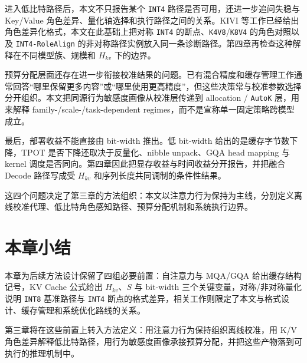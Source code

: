 进入低比特路径后，本文不只报告某个 \texttt{INT4} 路径是否可用，还进一步追问失稳与 Key/Value 角色差异、量化轴选择和执行路径之间的关系。KIVI 等工作已经给出角色差异化格式，本文在此基础上把对称 \texttt{INT4} 的断点、\texttt{K4V8}/\texttt{K8V4} 的角色对照以及 \texttt{INT4-RoleAlign} 的非对称路径实例放入同一条诊断路径。第四章再检查这种解释在不同模型族、规模和 $H_{kv}$ 下的边界。

预算分配层面还存在进一步衔接校准结果的问题。已有混合精度和缓存管理工作通常回答“哪里保留更多内容”或“哪里使用更高精度”，但这些决策常与校准参数选择分开组织。本文把同源行为敏感度画像从校准层传递到 allocation / \texttt{AutoK} 层，用来解释 family-/scale-/task-dependent regimes，而不是宣称单一固定策略跨模型成立。

最后，部署收益不能直接由 bit-width 推出。低 bit-width 给出的是缓存字节数下降，TPOT 是否下降还取决于反量化、nibble unpack、GQA head mapping 与 kernel 调度是否同向。第四章因此把显存收益与时间收益分开报告，并把融合 Decode 路径写成受 $H_{kv}$ 和序列长度共同调制的条件性结果。

这四个问题决定了第三章的方法组织：本文以注意力行为保持为主线，分别定义离线校准代理、低比特角色感知路径、预算分配机制和系统执行边界。

\section{本章小结}

本章为后续方法设计保留了四组必要前置：自注意力与 MQA/GQA 给出缓存结构记号，KV Cache 公式给出 $H_{kv}$、$S$ 与 bit-width 三个关键变量，对称/非对称量化说明 \texttt{INT8} 基准路径与 \texttt{INT4} 断点的格式差异，相关工作则限定了本文与格式设计、缓存管理和系统优化路线的关系。

第三章将在这些前置上转入方法定义：用注意力行为保持组织离线校准，用 K/V 角色差异解释低比特路径，用行为敏感度画像承接预算分配，并把这些产物落到可执行的推理机制中。
